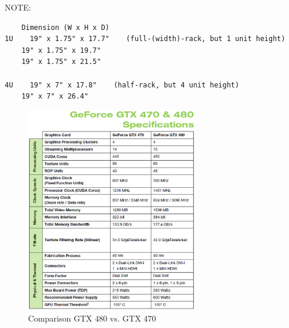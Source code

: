 NOTE:
\begin{verbatim}
    Dimension (W x H x D)
1U    19" x 1.75" x 17.7"    (full-(width)-rack, but 1 unit height)
    19" x 1.75" x 19.7"
    19" x 1.75" x 21.5"
    
4U    19" x 7" x 17.8"    (half-rack, but 4 unit height)
    19" x 7" x 26.4"
\end{verbatim}



\begin{figure}[hbt]
  \centerline{\includegraphics[height=9cm,
    angle=0]{./images/gtx480_470.eps}}
\caption{Comparison GTX 480 vs. GTX 470}
\label{fig:gtx480_470}
\end{figure}

